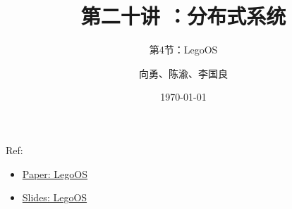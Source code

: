 


\title[第20讲]{第二十讲 ：分布式系统} %
\subtitle{第4节：LegoOS}
\author{向勇、陈渝、李国良} %
\date{\today} %


    
\begin{frame}
    \titlepage %

    
    Ref:
        \begin{itemize}
            \item \href{https://www.usenix.org/system/files/osdi18-shan.pdf}{Paper: LegoOS} %
            \item \href{https://www.usenix.org/sites/default/files/conference/protected-files/osdi18_slides_shan.pdf}{Slides: LegoOS} %
        \end{itemize}
    
\end{frame}
